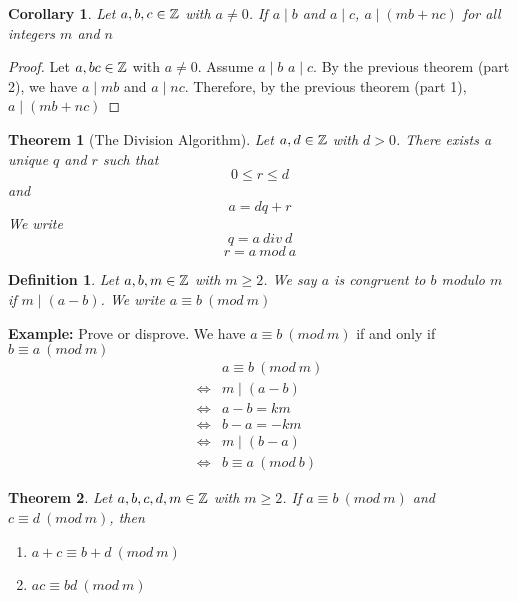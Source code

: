 \documentclass[openany]{report}
\newtheorem{theorem}{Theorem}[section]
\newtheorem{definition}{Definition}[section]
\newtheorem{corollary}{Corollary}[section]
\begin{document}
\begin{corollary}\label{corollary4.1.1}
Let $a,b,c \in \mathbb{Z}$ with $a \neq 0$. If $a\mid b$ and $a \mid c$, $a \mid (mb + nc)$ for all integers $m$ and $n$
\end{corollary}
\begin{proof}
    Let $a,b c \in \mathbb{Z}$ with $a \neq 0$. Assume $a \mid b$  $a \mid c$. By the previous theorem (part 2), we have $a \mid mb$ and $a \mid nc$. Therefore, by the previous theorem (part 1), $a \mid (mb + nc)$
\end{proof}
\begin{theorem}[The Division Algorithm]\label{theorem4.1.2}
Let $a, d \in \mathbb{Z}$ with $d > 0$. There exists a unique $q$ and $r$ such that 
$$0 \leq r \leq d$$
and 
$$a = dq + r$$
We write 
$$q = a \ div \ d$$
$$r=  a \ mod \ a $$
\end{theorem}
\begin{definition}\label{definition4.1.2}
    Let $a, b, m \in \mathbb{Z}$ with $m \geq 2$. We say $a$ is congruent to $b$ modulo $m$ if $m \mid (a-b)$. We write $a \equiv b \ (mod \ m)$
\end{definition}
\textbf{Example:} Prove or disprove. We have $a \equiv b \ (mod \ m)$ if and only if $b \equiv a \ (mod \ m)$
\begin{align*}
    &a \equiv b \ (mod \ m)\\
    \iff& m \mid (a - b)\tag{by definition}\\
    \iff& a - b = km\tag{$k \in \ints$}\\
    \iff& b - a = -km\\
    \iff& m \mid (b -a)\\
    \iff& b \equiv a \ (mod \ b)\tag{by definition}
\end{align*}
\begin{theorem}\label{theorem4.1.3}
    Let $a,b,c,d,m \in \mathbb{Z}$ with $m \geq 2$. If $a \equiv b \ (mod \ m)$ and $c \equiv d \ (mod \ m)$, then 
    \begin{enumerate}
        \item $a + c \equiv b + d \ (mod \ m)$
        \item $ac \equiv bd \ (mod \ m)$
    \end{enumerate}
\end{theorem}
\end{document}
